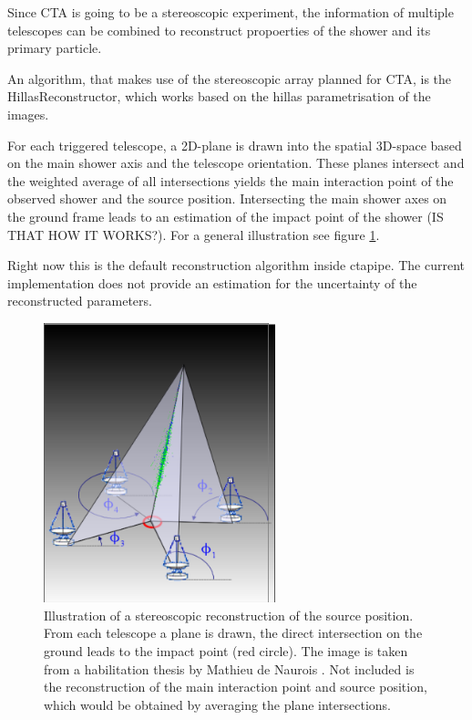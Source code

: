 Since CTA is going to be a stereoscopic experiment,
the information of multiple telescopes can be combined to
reconstruct propoerties of the shower and its primary particle.

An algorithm, that makes use of the stereoscopic array planned for CTA,
is the HillasReconstructor, which works based on the hillas parametrisation
of the images.

For each triggered telescope, a 2D-plane is drawn into the spatial 3D-space based on the main shower 
axis and the telescope orientation. These planes intersect and 
the weighted average of all intersections yields the 
main interaction point of the observed shower and the source position.
Intersecting the main shower axes on the ground frame leads to 
an estimation of the impact point of the shower (IS THAT HOW IT WORKS?).
For a general illustration see figure \ref{fig:hillas_reconstructor}.

Right now this is the default reconstruction algorithm inside ctapipe.
The current implementation does not provide an 
estimation for the uncertainty of the reconstructed parameters.

\begin{figure}
	\centering
	\includegraphics[width=0.6\textwidth]{images/hillas_reco.png}
	\caption{Illustration of a stereoscopic reconstruction of the source position.
    From each telescope a plane is drawn, the direct intersection 
    on the ground leads to the impact point (red circle).
    The image is taken from a habilitation thesis by 
    Mathieu de Naurois \cite{hillas_reco}.
    Not included is the reconstruction of the main interaction point
    and source position, which would be obtained by averaging the plane
    intersections.}
	\label{fig:hillas_reconstructor}
\end{figure}

